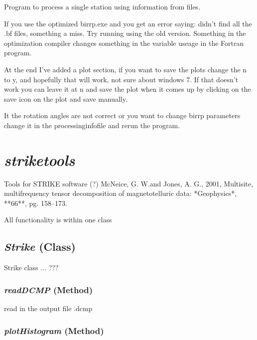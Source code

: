 Program to process a single station using information from files. 

If you use the optimized birrp.exe and you get an error saying: didn't find all
the .bf files, something a miss.  Try running using the old version.  Something
in the optimization compiler changes something in the variable useage in the
Fortran program.  

At the end I've added a plot section, if you want to save the plots change
the n to y, and hopefully that will work, not sure about windows 7.  If that 
doesn't work you can leave it at n and save the plot when it comes up by
clicking on the save icon on the plot and save manually.

It the rotation angles are not correct or you want to change birrp parameters
change it in the processinginfofile and rerun the program.




\section{\textit{striketools} }
\label{sec:processing.striketools}

Tools for STRIKE software (?) McNeice, G. W.and Jones, A. G., 2001, Multisite, multifrequency tensor 
            decomposition of magnetotelluric data: *Geophysics*, **66**, 
            pg. 158--173.

All functionality is within one class

\subsection{\textit{Strike} (Class)}
\label{ssec:processing.striketools.Strike}

Strike class ... ???

\subsubsection{\textit{readDCMP} (Method)}
\label{sssec:processing.striketools.Strike.readDCMP}

read in the output file .dcmp

\subsubsection{\textit{plotHistogram} (Method)}
\label{sssec:processing.striketools.Strike.plotHistogram}

